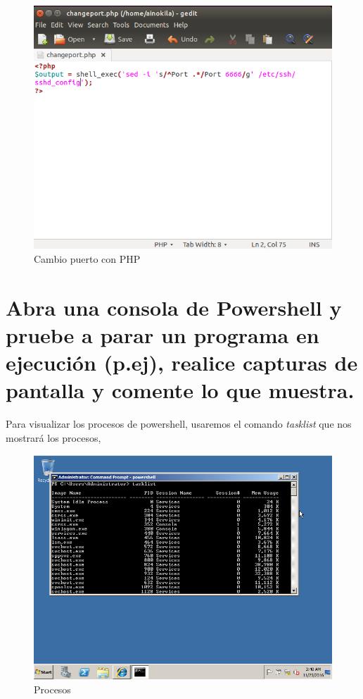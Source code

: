 	\begin{figure}[H]
	\centering
	\includegraphics[scale=0.35]{pics/change_port_script.png}  
	\caption{Cambio puerto con PHP} \label{fig:cambio_puerto_PHP}
\end{figure}


\section[Cuestión 17]{Abra una consola de Powershell y pruebe a parar un programa en ejecución (p.ej), realice capturas de pantalla y comente lo que muestra.}

Para visualizar los procesos de powershell, usaremos el comando \textit{tasklist}\cite{tasklist} que nos mostrará los procesos,

	\begin{figure}[H]
	\centering
	\includegraphics[scale=0.35]{pics/task.png}  
	\caption{Procesos} \label{fig:procesos}
	\end{figure}

